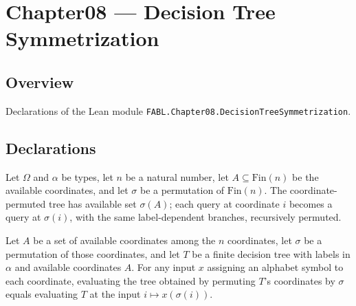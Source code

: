 \chapter{Chapter08 — Decision Tree Symmetrization}
\section{Overview}

Declarations of the Lean module \texttt{FABL.Chapter08.DecisionTreeSymmetrization}.

\section{Declarations}

\begin{definition}
\label{FABL.FiniteDecisionTree.permuteCoordinatesAux}
\leanok
{}
Let $\Omega$ and $\alpha$ be types, let $n$ be a natural number, let
$A\subseteq\mathrm{Fin}(n)$ be the available coordinates, and let $\sigma$ be a
permutation of $\mathrm{Fin}(n)$. The coordinate-permuted tree has available set
$\sigma(A)$; each query at coordinate $i$ becomes a query at $\sigma(i)$, with the same
label-dependent branches, recursively permuted.
\end{definition}

\begin{theorem}
\label{FABL.FiniteDecisionTree.eval_permuteCoordinatesAux}
\leanok
{}
Let $A$ be a set of available coordinates among the $n$ coordinates, let $\sigma$ be a
permutation of those coordinates, and let $T$ be a finite decision tree with labels in
$\alpha$ and available coordinates $A$. For any input $x$ assigning an alphabet symbol
to each coordinate, evaluating the tree obtained by permuting $T$'s coordinates by
$\sigma$ equals evaluating $T$ at the input $i\mapsto x(\sigma(i))$.
\end{theorem}

